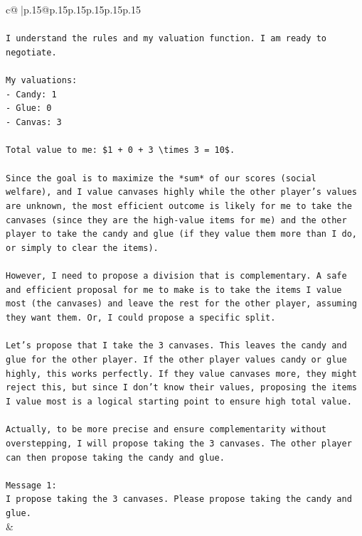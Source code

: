 \documentclass{article}
\begin{document}
{\begin{supertabular}{c@{$\;$}|p{.15\linewidth}@{}p{.15\linewidth}p{.15\linewidth}p{.15\linewidth}p{.15\linewidth}p{.15\linewidth}}
{{{\\ 
\\ 
\texttt{I understand the rules and my valuation function. I am ready to negotiate.} \\
\\ 
\texttt{My valuations:} \\
\texttt{{-} Candy: 1} \\
\texttt{{-} Glue: 0} \\
\texttt{{-} Canvas: 3} \\
\\ 
\texttt{Total value to me: \$1 + 0 + 3 \textbackslash{}times 3 = 10\$.} \\
\\ 
\texttt{Since the goal is to maximize the *sum* of our scores (social welfare), and I value canvases highly while the other player's values are unknown, the most efficient outcome is likely for me to take the canvases (since they are the high{-}value items for me) and the other player to take the candy and glue (if they value them more than I do, or simply to clear the items).} \\
\\ 
\texttt{However, I need to propose a division that is complementary. A safe and efficient proposal for me to make is to take the items I value most (the canvases) and leave the rest for the other player, assuming they want them. Or, I could propose a specific split.} \\
\\ 
\texttt{Let's propose that I take the 3 canvases. This leaves the candy and glue for the other player. If the other player values candy or glue highly, this works perfectly. If they value canvases more, they might reject this, but since I don't know their values, proposing the items I value most is a logical starting point to ensure high total value.} \\
\\ 
\texttt{Actually, to be more precise and ensure complementarity without overstepping, I will propose taking the 3 canvases. The other player can then propose taking the candy and glue.} \\
\\ 
\texttt{Message 1:} \\
\texttt{I propose taking the 3 canvases. Please propose taking the candy and glue.} \\
            }
        }
    }
    & \\ \\


\end{supertabular}}
\end{document}

